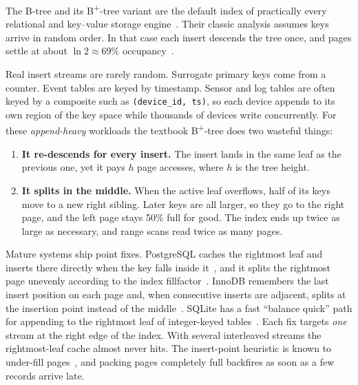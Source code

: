 \documentclass[conference]{IEEEtran}
\newcommand{\bp}{B\textsuperscript{+}-tree}
\begin{document}
The B-tree and its \bp{} variant are the default index of practically every
relational and key--value storage engine~\cite{bayer1972,comer1979,graefe2011}.
Their classic analysis assumes keys arrive in random order. In that case each
insert descends the tree once, and pages settle at about $\ln 2 \approx 69\%$
occupancy~\cite{yao1978}.

Real insert streams are rarely random. Surrogate primary keys come from a
counter. Event tables are keyed by timestamp. Sensor and log tables are often
keyed by a composite such as \texttt{(device\_id, ts)}, so each device appends
to its own region of the key space while thousands of devices write
concurrently. For these \emph{append-heavy} workloads the textbook \bp{} does
two wasteful things:
\begin{enumerate}
\item \textbf{It re-descends for every insert.} The insert lands in the same
  leaf as the previous one, yet it pays $h$ page accesses, where $h$ is the
  tree height.
\item \textbf{It splits in the middle.} When the active leaf overflows, half of
  its keys move to a new right sibling. Later keys are all larger, so they go
  to the right page, and the left page stays 50\% full for good. The index ends
  up twice as large as necessary, and range scans read twice as many pages.
\end{enumerate}

Mature systems ship point fixes. PostgreSQL caches the rightmost leaf and
inserts there directly when the key falls inside it~\cite{pgfastpath}, and it
splits the rightmost page unevenly according to the index
fillfactor~\cite{pgfillfactor}. InnoDB remembers the last insert position on
each page and, when consecutive inserts are adjacent, splits at the insertion
point instead of the middle~\cite{percona2017}. SQLite has a fast ``balance
quick'' path for appending to the rightmost leaf of integer-keyed
tables~\cite{sqlitebtree}. Each fix targets \emph{one} stream at the right edge
of the index. With several interleaved streams the rightmost-leaf cache
almost never hits. The insert-point heuristic is known to under-fill
pages~\cite{mysql67718}, and packing pages completely full backfires as
soon as a few records arrive late.
\end{document}
